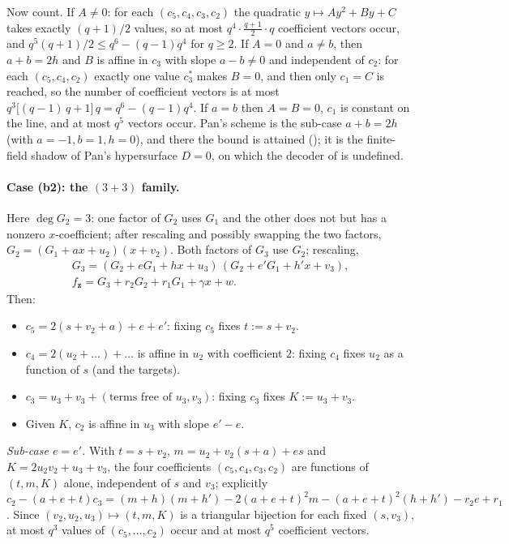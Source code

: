 Now count.  If $A\neq0$: for each $(c_5,c_4,c_3,c_2)$ the quadratic $y\mapsto Ay^2+By+C$
takes exactly $(q+1)/2$ values, so at most $q^4\cdot\frac{q+1}2\cdot q$ coefficient
vectors occur, and $q^5(q+1)/2\le q^6-(q-1)q^4$ for $q\ge2$.  If $A=0$ and $a\neq b$,
then $a+b=2h$ and $B$ is affine in $c_3$ with slope $a-b\neq0$ and independent of $c_2$:
for each $(c_5,c_4,c_2)$ exactly one value $c_3^*$ makes $B=0$, and then only $c_1=C$ is
reached, so the number of coefficient vectors is at most
$q^3\bigl[(q-1)\,q+1\bigr]\,q=q^6-(q-1)q^4$.  If $a=b$ then $A=B=0$, $c_1$ is constant
on the line, and at most $q^5$ vectors occur.  Pan's scheme is the sub-case $a+b=2h$
(with $a=-1,b=1,h=0$), and there the bound is attained
(); it is the finite-field shadow of Pan's hypersurface
$D=0$, on which the decoder of  is undefined.

\paragraph{Case (b2): the $(3{+}3)$ family.}
Here $\deg G_2=3$: one factor of $G_2$ uses $G_1$ and the other does not but has a
nonzero $x$-coefficient; after rescaling and possibly swapping the two factors,
$G_2=(G_1+ax+u_2)(x+v_2)$.  Both factors of $G_3$ use $G_2$; rescaling,
\begin{gather*}
   G_3=(G_2+eG_1+hx+u_3)\,(G_2+e'G_1+h'x+v_3),\\
   f_{\mathbf z}=G_3+r_2G_2+r_1G_1+\gamma x+w .
\end{gather*}
Then:
\begin{itemize}
\item $c_5=2(s+v_2+a)+e+e'$: fixing $c_5$ fixes $t:=s+v_2$.
\item $c_4=2(u_2+\dots)+\dots$ is affine in $u_2$ with coefficient $2$: fixing $c_4$ fixes
   $u_2$ as a function of $s$ (and the targets).
\item $c_3=u_3+v_3+(\text{terms free of }u_3,v_3)$: fixing $c_3$ fixes $K:=u_3+v_3$.
\item Given $K$, $c_2$ is affine in $u_3$ with slope $e'-e$.
\end{itemize}
\emph{Sub-case $e=e'$.}  With $t=s+v_2$, $m=u_2+v_2(s+a)+es$ and $K=2u_2v_2+u_3+v_3$, the
four coefficients $(c_5,c_4,c_3,c_2)$ are functions of $(t,m,K)$ alone, independent of $s$
and $v_3$; explicitly $c_2-(a+e+t)c_3=(m+h)(m+h')-2(a+e+t)^2m-(a+e+t)^2(h+h')-r_2e+r_1$.
Since $(v_2,u_2,u_3)\mapsto(t,m,K)$ is a triangular bijection for each fixed $(s,v_3)$,
at most $q^3$ values of $(c_5,\dots,c_2)$ occur and at most $q^5$ coefficient vectors.

